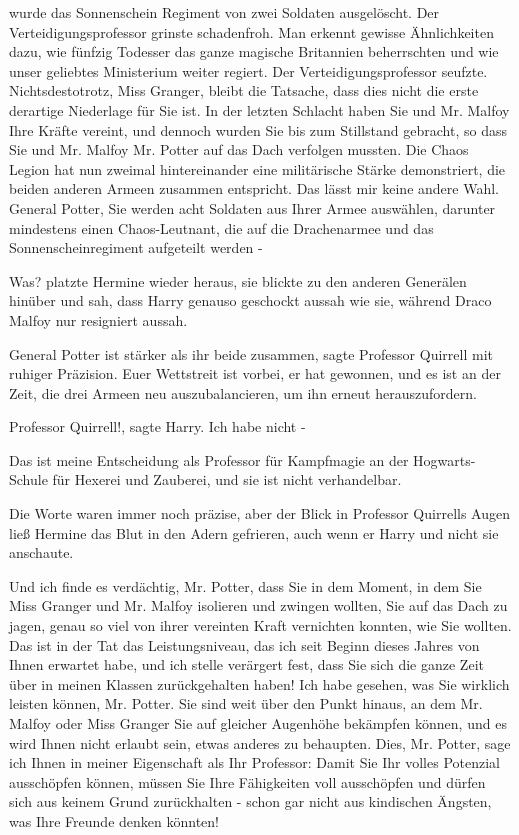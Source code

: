 wurde das Sonnenschein Regiment von zwei Soldaten ausgelöscht.\grqq{} Der
Verteidigungsprofessor grinste schadenfroh. \glqq{}Man erkennt gewisse
Ähnlichkeiten dazu, wie fünfzig Todesser das ganze magische Britannien
beherrschten und wie unser geliebtes Ministerium weiter regiert.\grqq{} Der
Verteidigungsprofessor seufzte. \glqq{}Nichtsdestotrotz, Miss Granger, bleibt die
Tatsache, dass dies nicht die erste derartige Niederlage für Sie ist. In der
letzten Schlacht haben Sie und Mr. Malfoy Ihre Kräfte vereint, und dennoch
wurden Sie bis zum Stillstand gebracht, so dass Sie und Mr. Malfoy Mr. Potter
auf das Dach verfolgen mussten. Die Chaos Legion hat nun zweimal hintereinander
eine militärische Stärke demonstriert, die beiden anderen Armeen zusammen
entspricht. Das lässt mir keine andere Wahl. General Potter, Sie werden acht
Soldaten aus Ihrer Armee auswählen, darunter mindestens einen Chaos-Leutnant,
die auf die Drachenarmee und das Sonnenscheinregiment aufgeteilt werden -\grqq{}

\glqq{}Was?\grqq{} platzte Hermine wieder heraus, sie blickte zu den anderen
Generälen hinüber und sah, dass Harry genauso geschockt aussah wie sie, während
Draco Malfoy nur resigniert aussah.

\glqq{}General Potter ist stärker als ihr beide zusammen\grqq{}, sagte Professor
Quirrell mit ruhiger Präzision. \glqq{}Euer Wettstreit ist vorbei, er hat
gewonnen, und es ist an der Zeit, die drei Armeen neu auszubalancieren, um ihn
erneut herauszufordern.\grqq{}

\glqq{}Professor Quirrell!\grqq{}, sagte Harry. \glqq{}Ich habe nicht -\grqq{}

\glqq{}Das ist meine Entscheidung als Professor für Kampfmagie an der
Hogwarts-Schule für Hexerei und Zauberei, und sie ist nicht verhandelbar.\grqq{}

Die Worte waren immer noch präzise, aber der Blick in Professor Quirrells Augen
ließ Hermine das Blut in den Adern gefrieren, auch wenn er Harry und nicht sie
anschaute.

\glqq{}Und ich finde es verdächtig, Mr. Potter, dass Sie in dem Moment, in dem
Sie Miss Granger und Mr. Malfoy isolieren und zwingen wollten, Sie auf das Dach
zu jagen, genau so viel von ihrer vereinten Kraft vernichten konnten, wie Sie
wollten. Das ist in der Tat das Leistungsniveau, das ich seit Beginn dieses
Jahres von Ihnen erwartet habe, und ich stelle verärgert fest, dass Sie sich die
ganze Zeit über in meinen Klassen zurückgehalten haben! Ich habe gesehen, was
Sie wirklich leisten können, Mr. Potter. Sie sind weit über den Punkt hinaus, an
dem Mr. Malfoy oder Miss Granger Sie auf gleicher Augenhöhe bekämpfen können,
und es wird Ihnen nicht erlaubt sein, etwas anderes zu behaupten. Dies, Mr.
Potter, sage ich Ihnen in meiner Eigenschaft als Ihr Professor: Damit Sie Ihr
volles Potenzial ausschöpfen können, müssen Sie Ihre Fähigkeiten voll
ausschöpfen und dürfen sich aus keinem Grund zurückhalten - schon gar nicht aus
kindischen Ängsten, was Ihre Freunde denken könnten!\grqq{}

